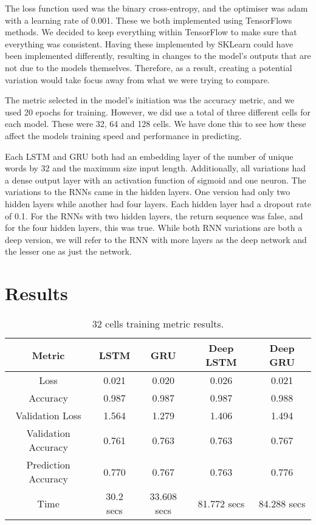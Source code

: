 \documentclass[a4paper,10pt]{article}
\begin{document}
	The loss function used was the binary cross-entropy, and the optimiser was adam with a learning rate of 0.001. These we both implemented using TensorFlows methods. We decided to keep everything within TensorFlow to make sure that everything was consistent. Having these implemented by SKLearn could have been implemented differently, resulting in changes to the model's outputs that are not due to the models themselves. Therefore, as a result, creating a potential variation would take focus away from what we were trying to compare.
	
	The metric selected in the model's initiation was the accuracy metric, and we used 20 epochs for training. However, we did use a total of three different cells for each model. These were 32, 64 and 128 cells. We have done this to see how these affect the models training speed and performance in predicting.  
	
	Each LSTM and GRU both had an embedding layer of the number of unique words by 32 and the maximum size input length. Additionally, all variations had a dense output layer with an activation function of sigmoid and one neuron. The variations to the RNNs came in the hidden layers. One version had only two hidden layers while another had four layers. Each hidden layer had a dropout rate of 0.1. For the RNNs with two hidden layers, the return sequence was false, and for the four hidden layers, this was true. While both RNN variations are both a deep version, we will refer to the RNN with more layers as the deep network and the lesser one as just the network.
	

\section{Results}
	
	\begin{table}[t]
		\centering
		\small
		\begin{tabular}[t]{ | c | c | c | c | c | }
			\hline
			Metric          & LSTM  & GRU   & Deep LSTM & Deep GRU \\ 
			\hline
			Loss            & 0.021 & 0.020 & 0.026     & 0.021 \\ 
			\hline
			Accuracy        & 0.987 & 0.987 & 0.987     & 0.988  \\ 
			\hline
			Validation Loss & 1.564 & 1.279 & 1.406 & 1.494 \\
			\hline
			Validation Accuracy & 0.761 & 0.763 & 0.763 & 0.767 \\
			\hline
			Prediction Accuracy & 0.770     & 0.767 & 0.763     & 0.776 \\
			\hline 
			Time & 30.2 secs & 33.608 secs & 81.772 secs & 84.288 secs \\ 
			\hline
		\end{tabular}
		\caption{32 cells training metric results.}
		\label{tab:32_metrics}
	\end{table}%
\end{document}
